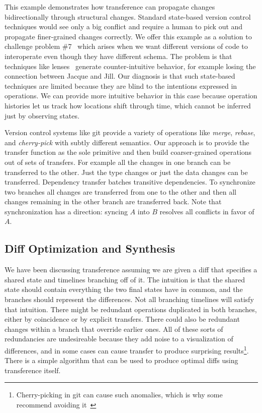 \documentclass[english,submission]{programming}
\theoremstyle{definition}
\begin{document}
This example demonstrates how transference can propagate changes bidirectionally through structural changes. Standard state-based version control techniques would see only a big conflict and require a human to pick out and propagate finer-grained changes correctly. We offer this example as a solution to challenge problem \#7~\cite{challenge-problems} which arises when we want different versions of code to interoperate even though they have different schema. The problem is that techniques like lenses~\cite{Foster2007} generate counter-intuitive behavior, for example losing the connection between Jacque and Jill. Our diagnosis is that such state-based techniques are limited because they are blind to the intentions expressed in operations. We can provide more intuitive behavior in this case because operation histories let us track how locations shift through time, which cannot be inferred just by observing states.

Version control systems like git provide a variety of operations like \textit{merge}, \textit{rebase}, and \textit{cherry-pick} with subtly different semantics. Our approach is to provide the transfer function as the sole primitive and then build coarser-grained operations out of sets of transfers. For example all the changes in one branch can be transferred to the other. Just the type changes or just the data changes can be transferred. Dependency transfer batches transitive dependencies. To synchronize two branches all changes are transferred from one to the other and then all changes remaining in the other branch are transferred back. Note that synchronization has a direction: syncing $A$ into $B$ resolves all conflicts in favor of $A$.


\subsection{Diff Optimization and Synthesis}\label{diff-synth}

We have been discussing transference assuming we are given a diff that specifies a shared state and timelines branching off of it. The intuition is that the shared state should contain everything the two final states have in common, and the branches should represent the differences. Not all branching timelines will satisfy that intuition. There might be redundant operations duplicated in both branches, either by coincidence or by explicit transfers. There could also be redundant changes within a branch that override earlier ones. All of these sorts of redundancies are undesireable because they add noise to a visualization of differences, and in some cases can cause transfer to produce surprising results\footnote{Cherry-picking in git can cause such anomalies, which is why some recommend avoiding it~\cite{philomatics-git}}. There is a simple algorithm that can be used to produce optimal diffs using transference itself.
\end{document}
